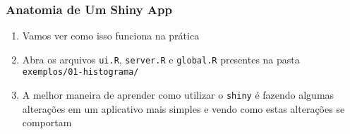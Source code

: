 \documentclass[12pt, compress, usetitleprogressbar]{beamer}\usepackage[]{graphicx}\usepackage[]{color}
\begin{document}
\begin{comment}




\begin{frame}

\frametitle{Anatomia de Um Shiny App}

\begin{enumerate}[label=$\bullet$, leftmargin=*]

  \item Vamos ver como isso funciona na prática

  \item Abra todos os três arquivos da pasta \texttt{exemplos/01-kmeans/}

\end{enumerate}

\end{frame}









\begin{frame}

\frametitle{Anatomia de Um Shiny App}

\begin{enumerate}[label=$\bullet$, leftmargin=*]

  \item Vamos fazer algumas alterações em um aplicativo mais simples

  \item Abra todos os três arquivos da pasta \texttt{exemplos/02-histograma/}

\end{enumerate}

\end{frame}


\end{comment}





\begin{frame}

\frametitle{Anatomia de Um Shiny App}

\begin{enumerate}[label=$\bullet$, leftmargin=*]

  \item Vamos ver como isso funciona na prática

  \item Abra os arquivos \texttt{ui.R}, \texttt{server.R} e \texttt{global.R} presentes na pasta \texttt{exemplos/01-histograma/}

  \item A melhor maneira de aprender como utilizar o \texttt{shiny} é fazendo algumas alterações em um aplicativo mais simples e vendo como estas alterações se comportam

\end{enumerate}

\end{frame}
\end{document}
